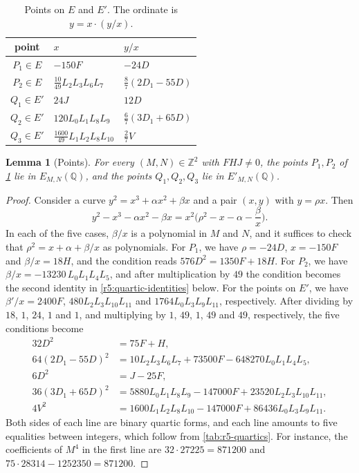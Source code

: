 \documentclass[12pt,oneside,openany]{book}
\theoremstyle{definition}
\theoremstyle{plain}
\numberwithin{equation}{chapter}
\theoremstyle{plain}
\newtheorem{lemma}[lemma]{Lemma}
\theoremstyle{definition}
\theoremstyle{remark}
\newcommand{\Q}{\mathbb Q}
\newcommand{\Z}{\mathbb Z}
\begin{document}
\begin{table}[htbp]
\centering
\caption{Points on $E$ and $E'$. The ordinate is $y=x\cdot(y/x)$.}\label{tab:r5-points}
\begin{tabular}{cll}
\toprule
point & $x$ & $y/x$\\
\midrule
$P_1\in E$ & $-150F$ & $-24D$\\
$P_2\in E$ & $\tfrac{10}{49}L_2L_3L_6L_7$ & $\tfrac87(2D_1-55D)$\\
$Q_1\in E'$ & $24J$ & $12D$\\
$Q_2\in E'$ & $120L_0L_1L_8L_9$ & $\tfrac67(3D_1+65D)$\\
$Q_3\in E'$ & $\tfrac{1600}{49}L_1L_2L_8L_{10}$ & $\tfrac27V$\\
\bottomrule
\end{tabular}
\end{table}

\begin{lemma}[Points]\label{lem:r5-points}
For every $(M,N)\in\Z^2$ with $FHJ\ne0$, the points $P_1,P_2$ of \cref{tab:r5-points} lie in $E_{M,N}(\Q)$, and the points $Q_1,Q_2,Q_3$ lie in $E'_{M,N}(\Q)$.
\end{lemma}

\begin{proof}
Consider a curve $y^2=x^3+\alpha x^2+\beta x$ and a pair $(x,y)$ with $y=\rho x$. Then
\[
y^2-x^3-\alpha x^2-\beta x=x^2\Big(\rho^2-x-\alpha-\frac\beta x\Big).
\]
In each of the five cases, $\beta/x$ is a polynomial in $M$ and $N$, and it suffices to check that $\rho^2=x+\alpha+\beta/x$ as polynomials. For $P_1$, we have $\rho=-24D$, $x=-150F$ and $\beta/x=18H$, and the condition reads $576D^2=1350F+18H$. For $P_2$, we have $\beta/x=-13230\,L_0L_1L_4L_5$, and after multiplication by $49$ the condition becomes the second identity in \eqref{r5:quartic-identities} below. For the points on $E'$, we have $\beta'/x=2400F$, $480L_2L_3L_{10}L_{11}$ and $1764L_0L_3L_9L_{11}$, respectively. After dividing by $18$, $1$, $24$, $1$ and $1$, and multiplying by $1$, $49$, $1$, $49$ and $49$, respectively, the five conditions become
\begin{equation}\label{r5:quartic-identities}
\begin{aligned}
32D^2&=75F+H,\\
64(2D_1-55D)^2&=10L_2L_3L_6L_7+73500F-648270L_0L_1L_4L_5,\\
6D^2&=J-25F,\\
36(3D_1+65D)^2&=5880L_0L_1L_8L_9-147000F+23520L_2L_3L_{10}L_{11},\\
4V^2&=1600L_1L_2L_8L_{10}-147000F+86436L_0L_3L_9L_{11}.
\end{aligned}
\end{equation}
Both sides of each line are binary quartic forms, and each line amounts to five equalities between integers, which follow from \cref{tab:r5-quartics}. For instance, the coefficients of $M^4$ in the first line are $32\cdot27225=871200$ and $75\cdot28314-1252350=871200$.
\end{proof}
\end{document}

